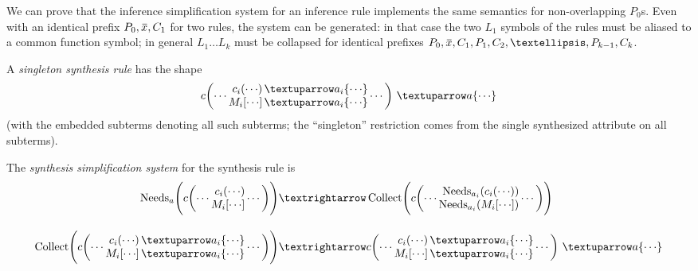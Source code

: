 \documentclass[letterpaper,11pt]{article}
\begin{document}
We can prove that the inference simplification system for an inference rule implements the same
semantics for non-overlapping $P_0$s. Even with an identical prefix $P_0,\ov{x},C_1$ for two rules,
the system can be generated: in that case the two $L_1$ symbols of the rules must be aliased to a
common function symbol; in general $L_1…L_k$ must be collapsed for identical prefixes
$P_0,\ov{x},C_1,P_1, C_2,…,P_{k-1}, C_k$. 

\begin{definition}\label{def:synth}%
  A \emph{singleton synthesis rule} has the shape
  \begin{displaymath}
    c\biggl(\cdots \vcenter{\txt{
          $c_i({\cdots})\,{{↑}a_i\{{\cdots}\}}$\\
          $M_i[{\cdots}]\,{{↑}a_i\{{\cdots}\}}$
        }}\cdots\biggr)
    ~{{↑}a\{{\cdots}\}}
  \end{displaymath}
  (with the embedded subterms denoting all such subterms; the ``singleton'' restriction comes from
  the single synthesized attribute on all subterms).

  The \emph{synthesis simplification system} for the synthesis rule is
  \begin{align*}
    \op{Needs}_a\Biggl(
    c\biggl(\cdots \vcenter{\txt{
        $c_i({\cdots})$\\
        $M_i[{\cdots}]$
      }}\cdots\biggr)
    \Biggr)
    &→
    \op{Collect}\Biggl(
    c\biggl(\cdots \vcenter{\txt{
        $\op{Needs}_{{a_i}}(c_i({\cdots}))$\\
        $\op{Needs}_{{a_i}}(M_i[{\cdots}])$
      }}\cdots\biggr)    
    \Biggr)
    \\[1em]
    \op{Collect}\Biggl(
    c\biggl(\cdots \vcenter{\txt{
          $c_i({\cdots})\,{↑}a_i\{{\cdots}\}$\\
          $M_i[{\cdots}]\,{↑}a_i\{{\cdots}\}$
      }}\cdots\biggr)
    \Biggr)
    &→
    c\biggl(\cdots \vcenter{\txt{
          $c_i({\cdots})\,{↑}a_i\{{\cdots}\}$\\
          $M_i[{\cdots}]\,{↑}a_i\{{\cdots}\}$
        }}\cdots\biggr)
    ~{↑}a\{{\cdots}\}
  \end{align*}
\end{definition}

\begin{example}
\end{example}

\end{document}

